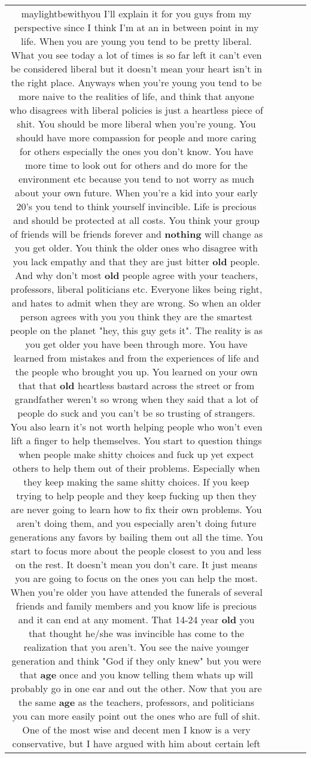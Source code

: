 \documentclass[11pt]{article}
\newlength\mylength
\begin{document}
\begin{center}
\begin{longtable}{|C{.65\mylength}|C{.30\mylength}|C{.12\mylength}|C{.12\mylength}|C{.12\mylength}|}
  \small maylightbewithyou I'll explain it for you guys from my perspective since I think I'm at an in between point in my life. When you are young you tend to be pretty liberal. What you see today a lot of times is so far left it can't even be considered liberal but it doesn't mean your heart isn't in the right place. Anyways when you're young you tend to be more naive to the realities of life, and think that anyone who disagrees with liberal policies is just a heartless piece of shit. You should be more liberal when you're young. You should have more compassion for people and more caring for others especially the ones you don't know. You have more time to look out for others and do more for the environment etc because you tend to not worry as much about your own future. When you're a kid into your early 20's you tend to think yourself invincible. Life is precious and should be protected at all costs. You think your group of friends will be friends forever and \textbf{nothing} will change as you get older. You think the older ones who disagree with you lack empathy and that they are just bitter \textbf{old} people. And why don't most \textbf{old} people agree with your teachers, professors, liberal politicians etc. Everyone likes being right, and hates to admit when they are wrong. So when an older person agrees with you you think they are the smartest people on the planet "hey, this guy gets it". The reality is as you get older you have been through more. You have learned from mistakes and from the experiences of life and the people who brought you up. You learned on your own that that \textbf{old} heartless bastard across the street or from grandfather weren't so wrong when they said that a lot of people do suck and you can't be so trusting of strangers. You also learn it's not worth helping people who won't even lift a finger to help themselves. You start to question things when people make shitty choices and fuck up yet expect others to help them out of their problems. Especially when they keep making the same shitty choices. If you keep trying to help people and they keep fucking up then they are never going to learn how to fix their own problems. You aren't doing them, and you especially aren't doing future generations any favors by bailing them out all the time. You start to focus more about the people closest to you and less on the rest. It doesn't mean you don't care. It just means you are going to focus on the ones you can help the most. When you're older you have attended the funerals of several friends and family members and you know life is precious and it can end at any moment. That 14-24 year \textbf{old} you that thought he/she was invincible has come to the realization that you aren't. You see the naive younger generation and think "God if they only knew" but you were that \textbf{age} once and you know telling them whats up will probably go in one ear and out the other. Now that you are the same \textbf{age} as the teachers, professors, and politicians you can more easily point out the ones who are full of shit. One of the most wise and decent men I know is a very conservative, but I have argued with him about certain left 
\end{longtable}
\end{center}
\end{document}
